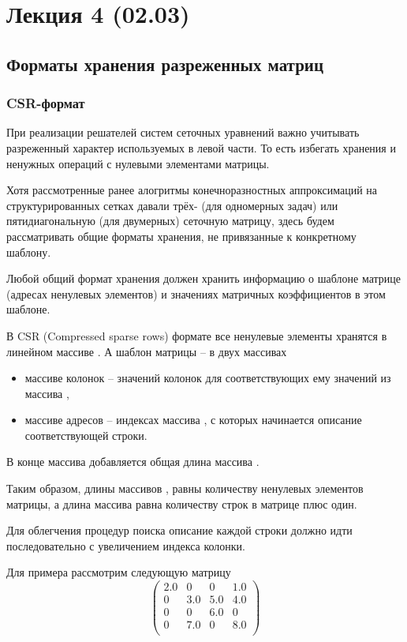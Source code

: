 \section{Лекция 4 (02.03)}
\subsection{Форматы хранения разреженных матриц}
\subsubsection{CSR-формат}
\label{sec:csr}
При реализации решателей систем сеточных уравнений важно учитывать
разреженный характер используемых в левой части. То есть избегать
хранения и ненужных операций с нулевыми элементами матрицы.

Хотя рассмотренные ранее алогритмы конечноразностных аппроксимаций на структурированных сетках
давали трёх- (для одномерных задач) или пятидиагональную (для двумерных) сеточную матрицу,
здесь будем рассматривать общие форматы хранения, не привязанные к конкретному шаблону.

Любой общий
формат хранения должен хранить
информацию о шаблоне матрице (адресах ненулевых элементов)
и значениях матричных коэффициентов в этом шаблоне.

В CSR (Compressed sparse rows) формате
все ненулевые элементы хранятся в линейном массиве .
А шаблон матрицы -- в двух массивах
\begin{itemize}
	\item массиве колонок  -- значений колонок для соответствующих ему значений из массива ,
	\item массиве адресов  -- индексах массива , с которых начинается описание соответствующей строки.
\end{itemize}
В конце массива  добавляется общая длина массива .

Таким образом, длины массивов ,  равны количеству ненулевых элементов матрицы,
а длина массива  равна количеству строк в матрице плюс один.

Для облегчения процедур поиска описание каждой строки должно идти последовательно
с увеличением индекса колонки.

Для примера рассмотрим следующую матрицу
\begin{equation}
\label{eq:example-sparse-matrix}
\left(
\begin{array}{cccc}
2.0 & 0 & 0 & 1.0 \\
0 & 3.0 & 5.0 & 4.0 \\
0 & 0 & 6.0 & 0 \\
0 & 7.0 & 0 & 8.0 \\
\end{array}
\right)
\end{equation}

